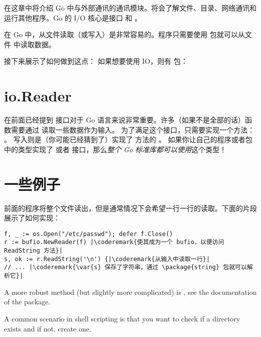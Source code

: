\noindent{}在这章中将介绍 Go 中与外部通讯的通讯模块。将会了解文件、目录、网络通讯和运行其他程序。Go 的 I/O 核心是接口  和 。

在 Go 中，从文件读取（或写入）是非常容易的。程序只需要使用
 包就可以从文件  中读取数据。

接下来展示了如何做到这点：
\showremarks
如果想要使用 IO，则有
 包：

\showremarks

\section{io.Reader}
在前面已经提到  接口对于 Go 语言来说非常重要。许多（如果不是全部的话）函数需要通过 
 读取一些数据作为输入。
为了满足这个接口，只需要实现一个方法：
。
写入则是（你可能已经猜到了）实现了  方法的 。
如果你让自己的程序或者包中的类型实现了  或者
 接口，那么\emph{整个 Go 标准库都可以使用}这个类型！

\section{一些例子}

前面的程序将整个文件读出，但是通常情况下会希望一行一行的读取。下面的片段展示了如何实现：

\begin{lstlisting}
f, _ := os.Open("/etc/passwd"); defer f.Close()
r := bufio.NewReader(f) |\coderemark{使其成为一个 bufio，以便访问 ReadString 方法}|
s, ok := r.ReadString('\n') {|\coderemark{从输入中读取一行}|
// ... |\coderemark{\var{s} 保存了字符串，通过 \package{string} 包就可以解析它}|
\end{lstlisting}

A more robust method (but slightly more complicated) is , see the documentation
of the  package.

A common scenario in shell scripting is that you want to check if a directory
exists and if not, create one. 

